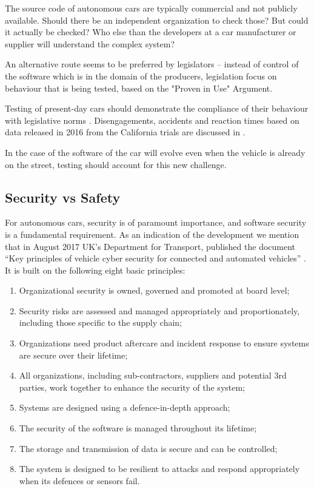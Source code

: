 The source code of autonomous cars are typically commercial and not publicly available. Should there be an independent organization to check those? But could it actually be checked? Who else than the developers at a car manufacturer or supplier will understand the complex system? 

An alternative route seems to be preferred by legislators – instead of control of the software which is in the domain of the producers, legislation focus on behaviour that is being tested, based on the "Proven in Use" Argument. %

Testing of present-day cars should demonstrate the compliance of their behaviour with legislative norms \cite{DepartmentofMotorVehiclesStateofCalifornia}. Disengagements, accidents and reaction times based on data released in 2016 from the California trials are discussed in \cite{10.1371/journal.pone.0168054}.

In the case of the software of the car will evolve even when the vehicle is already on the street, testing should account for this new challenge.



\subsection{Security vs Safety}
\label{sec:EAofTC:SecurityVSSafety}

For autonomous cars, security is of paramount importance, and software security is a fundamental requirement. As an indication of the development we mention that in August 2017 UK's Department for Transport, published the document \enquote{Key principles of vehicle cyber security for connected and automated vehicles} \cite{DepartmentforTransportDfT2017}. It is built on the following eight basic principles:

\begin{enumerate}
\item Organizational security is owned, governed and promoted at board level;
\item Security risks are assessed and managed appropriately and proportionately, including those specific to the supply chain;
\item Organizations need product aftercare and incident response to ensure systems are secure over their lifetime;
\item All organizations, including sub-contractors, suppliers and potential 3rd parties, work together to enhance the security of the system;
\item Systems are designed using a defence-in-depth approach;
\item The security of the software is managed throughout its lifetime;
\item The storage and transmission of data is secure and can be controlled;
\item The system is designed to be resilient to attacks and respond appropriately when its defences or sensors fail.
\end{enumerate}

